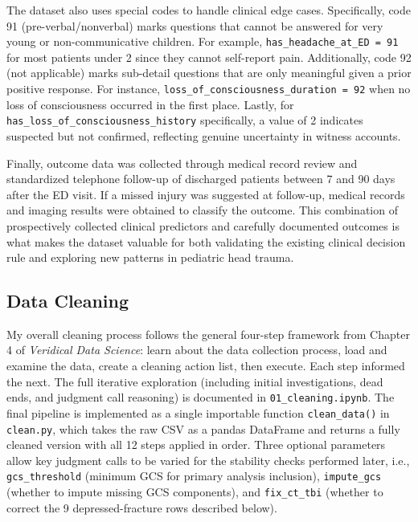 \documentclass[11pt,letterpaper]{article}
\begin{document}
The dataset also uses special codes to handle clinical edge cases. Specifically, code 91 (pre-verbal/nonverbal) marks questions that cannot be answered for very young or non-communicative children. For example, \texttt{has\_headache\_at\_ED = 91} for most patients under 2 since they cannot self-report pain. Additionally, code 92 (not applicable) marks sub-detail questions that are only meaningful given a prior positive response. For instance, \texttt{loss\_of\_consciousness\_duration = 92} when no loss of consciousness occurred in the first place. Lastly, for \texttt{has\_loss\_of\_consciousness\_history} specifically, a value of 2 indicates suspected but not confirmed, reflecting genuine uncertainty in witness accounts. 

Finally, outcome data was collected through medical record review and standardized telephone follow-up of discharged patients between 7 and 90 days after the ED visit. If a missed injury was suggested at follow-up, medical records and imaging results were obtained to classify the outcome. This combination of prospectively collected clinical predictors and carefully documented outcomes is what makes the dataset valuable for both validating the existing clinical decision rule and exploring new patterns in pediatric head trauma.

\subsection{Data Cleaning}\label{data-cleaning}

My overall cleaning process follows the general four-step framework from Chapter 4 of \textit{Veridical Data Science}: learn about the data collection process, load and examine the data, create a cleaning action list, then execute. Each step informed the next. The full iterative exploration (including initial investigations, dead ends, and judgment call reasoning) is documented in \texttt{01\_cleaning.ipynb}. The final pipeline is implemented as a single importable function \texttt{clean\_data()} in \texttt{clean.py}, which takes the raw CSV as a pandas DataFrame and returns a fully cleaned version with all 12 steps applied in order. Three optional parameters allow key judgment calls to be varied for the stability checks performed later, i.e., \texttt{gcs\_threshold} (minimum GCS for primary analysis inclusion), \texttt{impute\_gcs} (whether to impute missing GCS components), and \texttt{fix\_ct\_tbi} (whether to correct the 9 depressed-fracture rows described below).
\end{document}
